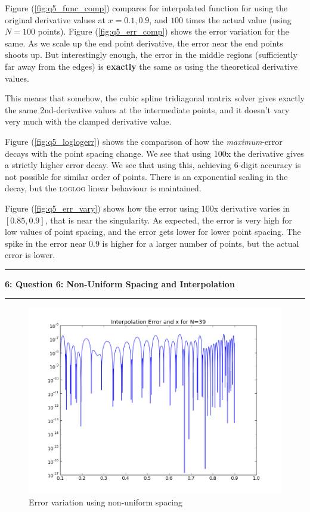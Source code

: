 \documentclass[11pt]{article}
\newcommand\question[2]{\vspace{.25in}\hrule\textbf{#1: #2}\vspace{.5em}\hrule\vspace{.10in}}
\begin{document}
Figure (\ref{fig:q5_func_comp}) compares for interpolated function for using the original derivative values at $x=0.1,0.9$,  and $100$ times the actual value (using $N=100$ points). Figure (\ref{fig:q5_err_comp}) shows the error variation for the same. As we scale up the end point derivative, the error near the end points shoots up. But interestingly enough, the error in the middle regions (sufficiently far away from the edges) is \textbf{exactly} the same as using the theoretical derivative values. 

This means that somehow, the cubic spline tridiagonal matrix solver gives exactly the same 2nd-derivative values at the intermediate points, and it doesn't vary very much with the clamped derivative value. 

Figure (\ref{fig:q5_loglogerr}) shows the comparison of how the \textit{maximum}-error decays with the point spacing change. We see that using $100$x the derivative gives a strictly higher error decay. We see that using this, achieving 6-digit accuracy is not possible for similar order of points. There is an exponential scaling in the decay, but the \textsc{loglog} linear behaviour is maintained. 

Figure (\ref{fig:q5_err_vary}) shows how the error using $100$x derivative varies in $[0.85,0.9]$, that is near the singularity. As expected, the error is very high for low values of point spacing, and the error gets lower for lower point spacing. The spike in the error near $0.9$ is higher for a larger number of points, but the actual error is lower. 

\pagebreak


\question{6}{Question 6: Non-Uniform Spacing and Interpolation } 
\setcounter{section}{6}


\begin{figure}
\centering
\includegraphics[width=0.6\linewidth]{q6/err.png}
\caption{Error variation using non-uniform spacing}
\label{fig:q6}
\vspace{-2.0em}
\end{figure}
\end{document}

